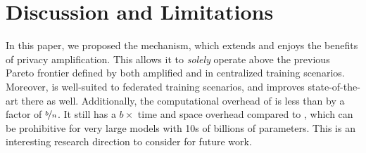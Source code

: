 \documentclass{article}
\begin{document}


\section{Discussion and Limitations}
In this paper, we proposed the \BANDMF mechanism, which extends \MFFTRL and enjoys the benefits of privacy amplification.  This allows it to \emph{solely} operate above the previous Pareto frontier defined by both amplified \dpsgd and \mfftrl in centralized training scenarios.  Moreover, \BANDMF is well-suited to federated training scenarios, and improves state-of-the-art there as well.  Additionally, the computational overhead of \BANDMF is less than \mfftrl by a factor of $\nicefrac{b}{n}$. It still has a $b\times$ time and space overhead compared to \dpsgd, which can be prohibitive for very large models with 10s of billions of parameters. This is an interesting research direction to consider for future work.
\end{document}
